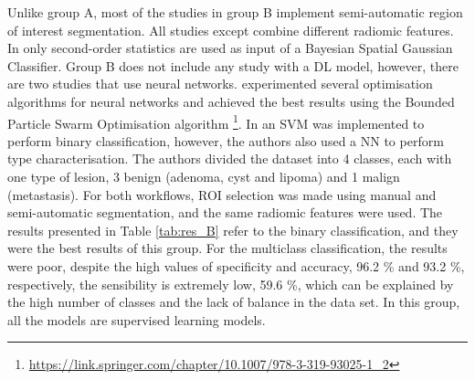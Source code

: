 \documentclass{article}
\begin{document}
Unlike group A, most of the studies in group B implement semi-automatic region
of interest segmentation. All studies except \cite{Li20190} combine different
radiomic features. In \cite{Li2019} only second-order statistics are used as
input of a Bayesian Spatial Gaussian Classifier. Group B does not include any
study with a DL model, however, there are two studies that use neural networks.
\cite{Koyuncu2019} experimented several optimisation algorithms for neural
networks and achieved the best results using the Bounded Particle Swarm
Optimisation algorithm \footnote{\href{https://link.springer.com/chapter/10.1007/978-3-319-93025-1\_2}{https://link.springer.com/chapter/10.1007/978-3-319-93025-1\_2}}. In
\cite{Barstugan2020} an SVM was implemented to perform binary classification,
however, the authors also used a NN to perform type characterisation. The
authors divided the dataset into 4 classes, each with one type of lesion, 3
benign (adenoma, cyst and lipoma) and 1 malign (metastasis). For both workflows,
ROI selection was made using manual and semi-automatic segmentation, and the
same radiomic features were used. The results presented in Table \ref{tab:res_B}
refer to the binary classification, and they were the best results of this
group. For the multiclass classification, the results were poor, despite the
high values of specificity and accuracy, 96.2 \% and 93.2 \%, respectively, the
sensibility is extremely low, 59.6 \%, which can be explained by the high number
of classes and the lack of balance in the data set. In this group, all the
models are supervised learning models.
\end{document}
